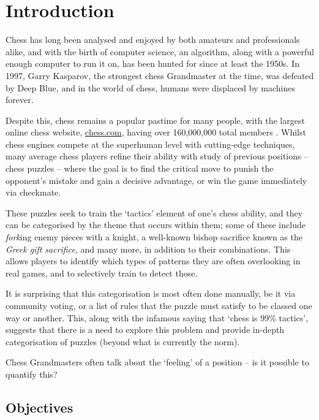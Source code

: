 \chapter{Introduction}

Chess has long been analysed and enjoyed by both amateurs and professionals
alike, and with the birth of computer science, an algorithm, along with a
powerful enough computer to run it on, has been hunted for since at least
the 1950s.\cite{shannon} In 1997, Garry Kasparov, the strongest chess
Grandmaster at the time, was defeated by Deep Blue,\cite{deepBlue} and
in the world of chess, humans were displaced by machines forever. 

Despite this, chess remains a popular pastime for many people, with the largest
online chess website, \url{chess.com}, having over 160,000,000 total members
\cite{chesscomMembers}. Whilst chess engines compete at the superhuman level
with cutting-edge techniques, many average chess players refine their ability
with study of previous positions -- chess puzzles -- where the goal is to find
the critical move to punish the opponent's mistake and gain a decisive
advantage, or win the game immediately via checkmate. 

These puzzles seek to train the `tactics' element of one's chess ability, and
they can be categorised by the theme that occurs within them; some of these
include \emph{fork}ing enemy pieces with a knight, a well-known bishop
sacrifice known as the \emph{Greek gift sacrifice}, and many more, in addition
to their combinations.\cite{chessPatterns} This allows players to identify
which types of patterns they are often overlooking in real games, and to
selectively train to detect those. 

It is surprising that this categorisation is most often done manually, be it
via community voting,\cite{lichessPuzzles} or a list of rules that the puzzle
must satisfy to be classed one way or another.\cite{lichessTagger} This, along
with the infamous saying that `chess is 99\% tactics', suggests that there is a
need to explore this problem and provide in-depth categorisation of puzzles
(beyond what is currently the norm).

Chess Grandmasters often talk about the `feeling' of a position -- is it
possible to quantify this?

\section{Objectives}

